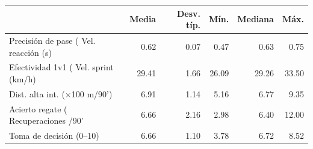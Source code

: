 \begin{tabular}{lrrrrr}
\toprule
 & Media & Desv. típ. & Mín. & Mediana & Máx. \\
\midrule
Precisión de pase (%
Vel. reacción (s) & 0.62 & 0.07 & 0.47 & 0.63 & 0.75 \\
Efectividad 1v1 (%
Vel. sprint (km/h) & 29.41 & 1.66 & 26.09 & 29.26 & 33.50 \\
Dist. alta int. (×100 m/90') & 6.91 & 1.14 & 5.16 & 6.77 & 9.35 \\
Acierto regate (%
Recuperaciones /90' & 6.66 & 2.16 & 2.98 & 6.40 & 12.00 \\
Toma de decisión (0–10) & 6.66 & 1.10 & 3.78 & 6.72 & 8.52 \\
\bottomrule
\end{tabular}

